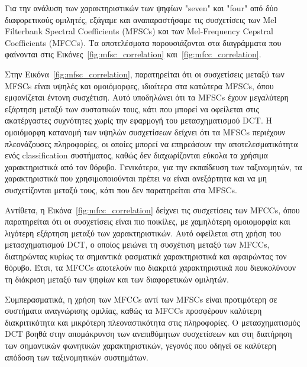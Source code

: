 \documentclass[a4paper,12pt]{article}
\begin{document}
Για την ανάλυση των χαρακτηριστικών των ψηφίων "seven" και "four" από δύο διαφορετικούς ομιλητές, 
εξάγαμε και αναπαραστήσαμε τις συσχετίσεις των Mel Filterbank Spectral Coefficients (MFSCs) και των Mel-Frequency Cepstral Coefficients (MFCCs). 
Τα αποτελέσματα παρουσιάζονται στα διαγράμματα που φαίνονται στις Εικόνες~\ref{fig:mfsc_correlation} και~\ref{fig:mfcc_correlation}.

Στην Εικόνα~\ref{fig:mfsc_correlation}, παρατηρείται ότι οι συσχετίσεις μεταξύ των MFSCs είναι υψηλές και ομοιόμορφες, 
ιδιαίτερα στα κατώτερα MFSCs, όπου εμφανίζεται έντονη συσχέτιση. Αυτό υποδηλώνει ότι τα MFSCs 
έχουν μεγαλύτερη εξάρτηση μεταξύ των συστατικών τους, κάτι που μπορεί να οφείλεται στις ακατέργαστες 
συχνότητες χωρίς την εφαρμογή του μετασχηματισμού DCT. Η ομοιόμορφη κατανομή των υψηλών συσχετίσεων 
δείχνει ότι τα MFSCs περιέχουν πλεονάζουσες πληροφορίες, οι οποίες μπορεί να επηρεάσουν την 
αποτελεσματικότητα ενός classification συστήματος, καθώς δεν διαχωρίζονται εύκολα τα χρήσιμα χαρακτηριστικά από τον θόρυβο.
Γενικότερα, για την εκπαίδευση των ταξινομητών, τα χαρακτηριστικά που χρησιμοποιούνται πρέπει να είναι ανεξάρτητα και 
να μη συσχετίζονται μεταξύ τους, κάτι που δεν παρατηρείται στα MFSCs.

Αντίθετα, η Εικόνα~\ref{fig:mfcc_correlation} δείχνει τις συσχετίσεις των MFCCs, όπου παρατηρείται ότι
οι συσχετίσεις είναι πιο ποικίλες, με χαμηλότερη ομοιομορφία και λιγότερη εξάρτηση μεταξύ των χαρακτηριστικών. 
Αυτό οφείλεται στη χρήση του μετασχηματισμού DCT, ο οποίος μειώνει τη συσχέτιση μεταξύ των MFCCs, 
διατηρώντας κυρίως τα σημαντικά φασματικά χαρακτηριστικά και αφαιρώντας τον θόρυβο. Έτσι, τα 
MFCCs αποτελούν πιο διακριτά χαρακτηριστικά που διευκολύνουν τη διάκριση μεταξύ των ψηφίων και των διαφορετικών ομιλητών.

Συμπερασματικά, η χρήση των MFCCs αντί των MFSCs είναι προτιμότερη σε συστήματα αναγνώρισης ομιλίας, 
καθώς τα MFCCs προσφέρουν καλύτερη διακριτικότητα και μικρότερη πλεοναστικότητα στις πληροφορίες. 
Ο μετασχηματισμός DCT βοηθά στην απομάκρυνση των ανεπιθύμητων συσχετίσεων και στη διατήρηση των 
σημαντικών φωνητικών χαρακτηριστικών, γεγονός που οδηγεί σε καλύτερη απόδοση των ταξινομητικών συστημάτων.
\end{document}
